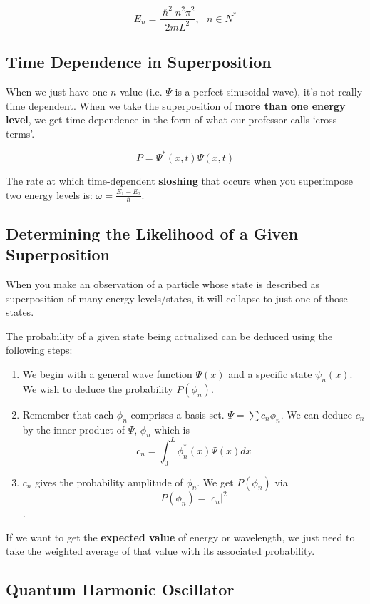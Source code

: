 \documentclass[a4paper,12pt]{report}
\begin{document}
$$E_n = \frac{\hslash^2 n^2 \pi^2}{2mL^2},\,\,\,\, n \in N^*$$

\subsection{Time Dependence in Superposition}

When we just have one $n$ value (i.e. $\Psi$ is a perfect sinusoidal wave), it's not really time dependent. When we take the superposition of \textbf{more than one energy level}, we get time dependence in the form of what our professor calls `cross terms'.

$$P = \Psi^*(x, t) \Psi(x, t)$$ 

The rate at which time-dependent \textbf{sloshing} that occurs when you superimpose two energy levels is: $\omega = \frac{E_1-E_2}{\hslash}$. 

\subsection{Determining the Likelihood of a Given Superposition}

When you make an observation of a particle whose state is described as superposition of many energy levels/states, it will collapse to just one of those states.

The probability of a given state being actualized can be deduced using the following steps:
\begin{enumerate}
\item We begin with a general wave function $\Psi(x)$ and a specific state $\psi_n(x)$. We wish to deduce the probability $P(\phi_n)$.
\item Remember that each $\phi_n$ comprises a basis set. $\Psi = \sum c_n \phi_n$. We can deduce $c_n$ by the inner product of $\Psi$, $\phi_n$ which is 
$$c_n = \int_0^L \phi_n^*(x)\Psi(x)dx$$
\item $c_n$ gives the probability amplitude of $\phi_n$. We get $P(\phi_n)$ via $$P(\phi_n) = |c_n|^2$$.
\end{enumerate}

If we want to get the \textbf{expected value} of energy or wavelength, we just need to take the weighted average of that value with its associated probability.

\subsection{Quantum Harmonic Oscillator}
\end{document}
